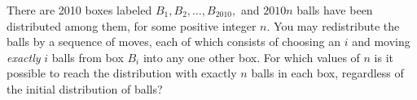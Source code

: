 There are 2010 boxes labeled $B_1,B_2,\dots,B_{2010},$ and $2010n$ balls have been distributed among them, for some positive integer $n.$ You may redistribute the balls by a sequence of moves, each of which consists of choosing an $i$ and moving \textit{exactly} $i$ balls from box $B_i$ into any one other box. For which values of $n$ is it possible to reach the distribution with exactly $n$ balls in each box, regardless of the initial distribution of balls?